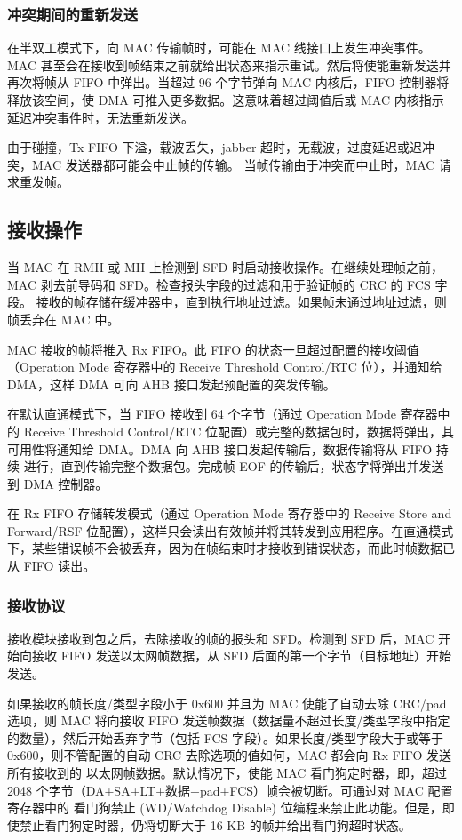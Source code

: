 \documentclass[main\_\_CN.tex]{subfiles}
\begin{document}
\subsubsection{冲突期间的重新发送}\label{section:Retransmission During a Collision}
在半双工模式下，向 MAC 传输帧时，可能在 MAC 线接口上发生冲突事件。MAC 甚至会在接收到帧结束之前就给出状态来指示重试。然后将使能重新发送并再次将帧从 FIFO 中弹出。当超过 96 个字节弹向 MAC 内核后，FIFO 控制器将释放该空间，使 DMA 可推入更多数据。这意味着超过阈值后或 MAC 内核指示延迟冲突事件时，无法重新发送。

由于碰撞，Tx FIFO 下溢，载波丢失，jabber 超时，无载波，过度延迟或迟冲突，MAC 发送器都可能会中止帧的传输。 当帧传输由于冲突而中止时，MAC 请求重发帧。

\subsection{接收操作}
当 MAC 在 RMII 或 MII 上检测到 SFD 时启动接收操作。在继续处理帧之前，MAC 剥去前导码和 SFD。检查报头字段的过滤和用于验证帧的 CRC 的 FCS 字段。 接收的帧存储在缓冲器中，直到执行地址过滤。如果帧未通过地址过滤，则帧丢弃在 MAC 中。

MAC 接收的帧将推入 Rx FIFO。此 FIFO 的状态一旦超过配置的接收阈值（Operation Mode 寄存器中的 Receive Threshold Control/RTC 位），并通知给 DMA，这样 DMA 可向 AHB 接口发起预配置的突发传输。

在默认直通模式下，当 FIFO 接收到 64 个字节（通过 Operation Mode 寄存器中的 Receive Threshold Control/RTC 位配置）或完整的数据包时，数据将弹出，其可用性将通知给 DMA。DMA 向 AHB 接口发起传输后，数据传输将从 FIFO 持续 进行，直到传输完整个数据包。完成帧 EOF 的传输后，状态字将弹出并发送到 DMA 控制器。

在 Rx FIFO 存储转发模式（通过 Operation Mode 寄存器中的 Receive Store and Forward/RSF 位配置），这样只会读出有效帧并将其转发到应用程序。在直通模式下，某些错误帧不会被丢弃，因为在帧结束时才接收到错误状态，而此时帧数据已从 FIFO 读出。

\subsubsection{接收协议}
接收模块接收到包之后，去除接收的帧的报头和 SFD。检测到 SFD 后，MAC 开始向接收 FIFO 发送以太网帧数据，从 SFD 后面的第一个字节（目标地址）开始发送。

如果接收的帧长度/类型字段小于 0x600 并且为 MAC 使能了自动去除 CRC/pad 选项，则 MAC 将向接收 FIFO 发送帧数据（数据量不超过长度/类型字段中指定的数量），然后开始丢弃字节（包括 FCS 字段）。如果长度/类型字段大于或等于 0x600，则不管配置的自动 CRC 去除选项的值如何，MAC 都会向 Rx FIFO 发送所有接收到的 以太网帧数据。默认情况下，使能 MAC 看门狗定时器，即，超过 2048 个字节（DA+SA+LT+数据+pad+FCS）帧会被切断。可通过对 MAC 配置寄存器中的 看门狗禁止 (WD/Watchdog Disable) 位编程来禁止此功能。但是，即使禁止看门狗定时器，仍将切断大于 16 KB 的帧并给出看门狗超时状态。
\end{document}
